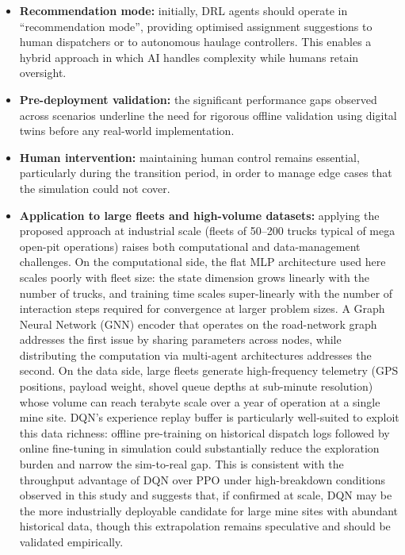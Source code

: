 \documentclass[11pt,a4paper]{article}
\begin{document}
\begin{itemize}
  \item \textbf{Recommendation mode:} initially, DRL agents should operate in ``recommendation mode'', providing optimised assignment suggestions to human dispatchers or to autonomous haulage controllers. This enables a hybrid approach in which AI handles complexity while humans retain oversight.
  \item \textbf{Pre-deployment validation:} the significant performance gaps observed across scenarios underline the need for rigorous offline validation using digital twins before any real-world implementation.
  \item \textbf{Human intervention:} maintaining human control remains essential, particularly during the transition period, in order to manage edge cases that the simulation could not cover.
  \item \textbf{Application to large fleets and high-volume datasets:} applying the proposed approach at industrial scale (fleets of 50--200 trucks typical of mega open-pit operations) raises both computational and data-management challenges. On the computational side, the flat MLP architecture used here scales poorly with fleet size: the state dimension grows linearly with the number of trucks, and training time scales super-linearly with the number of interaction steps required for convergence at larger problem sizes. A Graph Neural Network (GNN) encoder that operates on the road-network graph addresses the first issue by sharing parameters across nodes, while distributing the computation via multi-agent architectures addresses the second. On the data side, large fleets generate high-frequency telemetry (GPS positions, payload weight, shovel queue depths at sub-minute resolution) whose volume can reach terabyte scale over a year of operation at a single mine site. DQN's experience replay buffer is particularly well-suited to exploit this data richness: offline pre-training on historical dispatch logs followed by online fine-tuning in simulation could substantially reduce the exploration burden and narrow the sim-to-real gap. This is consistent with the throughput advantage of DQN over PPO under high-breakdown conditions observed in this study and suggests that, if confirmed at scale, DQN may be the more industrially deployable candidate for large mine sites with abundant historical data, though this extrapolation remains speculative and should be validated empirically.
\end{itemize}
\end{document}
